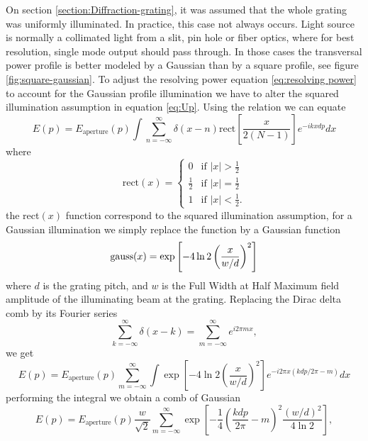 \documentclass[12pt,twoside,english]{book}
\renewcommand{\~}{\perispomeni}%
\numberwithin{equation}{section}
\numberwithin{figure}{section}
\begin{document}
On section \ref{section:Diffraction-grating}, it was assumed that the whole grating was uniformly illuminated. In practice, this case not always occurs. Light source is normally a collimated light from a slit, pin hole or fiber optics, where for best resolution, single mode output should pass through. In those cases the transversal power profile is better modeled by a Gaussian than by a square profile, see figure \ref{fig:square-gaussian}. To adjust the resolving power equation \ref{eq:resolving power} to account for the Gaussian profile illumination we have to alter the squared illumination assumption in equation \ref{eq:Up}. Using the relation we can equate 
\begin{equation}
E\left(p\right)=E_{\text{aperture}}\left(p\right)\int\sum_{n=-\infty}^{\infty}\delta\left(x-n\right)\text{rect}\left[\frac{x}{2\left(N-1\right)}\right]e^{-ikxdp}dx\end{equation}
where
\begin{equation}
\text{rect}\left(x\right)=\begin{cases}
0 & \mbox{if }\left|x\right|>\frac{1}{2}\\
\frac{1}{2} & \mbox{if }\left|x\right|=\frac{1}{2}\\
1 & \mbox{if }\left|x\right|<\frac{1}{2}.\end{cases}\end{equation}
the rect$\left(x\right)$ function correspond to the squared illumination assumption, for a Gaussian illumination we simply replace the function by a Gaussian function
\begin{equation}
\text{gauss}\mbox{\ensuremath{\left(x\right)}}=\exp\left[-4\ln2\left(\frac{x}{w/d}\right)^{2}\right]\end{equation}
where $d$ is the grating pitch, and $w$ is the Full Width at Half Maximum field amplitude of the illuminating beam at the grating. Replacing the Dirac delta comb by its Fourier series 
\begin{equation}
\sum_{k=-\infty}^{\infty}\delta\left(x-k\right)=\sum_{m=-\infty}^{\infty}e^{i2\pi mx},\end{equation}
we get
\begin{equation}
E\left(p\right)=E_{\text{aperture}}\left(p\right)\sum_{m=-\infty}^{\infty}\int\exp\left[-4\ln2\left(\frac{x}{w/d}\right)^{2}\right]e^{-i2\pi x\left(kdp/2\pi-m\right)}dx\end{equation}
performing the integral we obtain a comb of Gaussian 
\begin{equation}
E\left(p\right)=E_{\text{aperture}}\left(p\right)\frac{w}{\sqrt{2}}\sum_{m=-\infty}^{\infty}\exp\left[-\frac{1}{4}\left(\frac{kdp}{2\pi}-m\right)^{2}\frac{\left(w/d\right)^{2}}{4\ln2}\right],\label{eq:gaussian comb}\end{equation}
\end{document}
